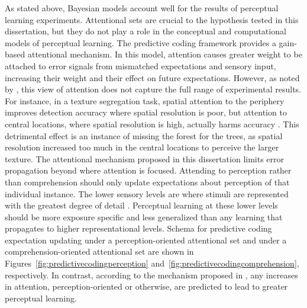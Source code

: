 As stated above, Bayesian models account well for the results of perceptual learning experiments.
Attentional sets are crucial to the hypothesis tested in this dissertation, but they do not play a role in the conceptual and computational models of perceptual learning.
The predictive coding framework \citep{Clark2013} provides a gain-based attentional mechanism. 
In this model, attention causes greater weight to be attached to error signals from mismatched expectations and sensory input, increasing their weight and their effect on future expectations.  
However, as noted by \citet{Block2013}, this view of attention does not capture the full range of experimental results.  
For instance, in a texture segregation task, spatial attention to the periphery improves detection accuracy where spatial resolution is poor, but attention to central locations, where spatial resolution is high, actually harms accuracy \citep{Yeshurun1998}.  
This detrimental effect is an instance of missing the forest for the trees, as spatial resolution increased too much in the central locations to perceive the larger texture.  
The attentional mechanism proposed in this dissertation limits error propagation beyond where attention is focused.
Attending to perception rather than comprehension should only update expectations about perception of that individual instance.
The lower sensory levels are where stimuli are represented with the greatest degree of detail \citep{Gilbert2001}.
Perceptual learning at these lower levels should be more exposure specific and less generalized than any learning that propagates to higher representational levels.
Schema for predictive coding expectation updating under a perception-oriented attentional set and under a comprehension-oriented attentional set are shown in Figures~\ref{fig:predictivecodingperception} and~\ref{fig:predictivecodingcomprehension}, respectively.
In contrast, according to the mechanism proposed in \citet{Clark2013}, any increases in attention, perception-oriented or otherwise, are predicted to lead to greater perceptual learning.


